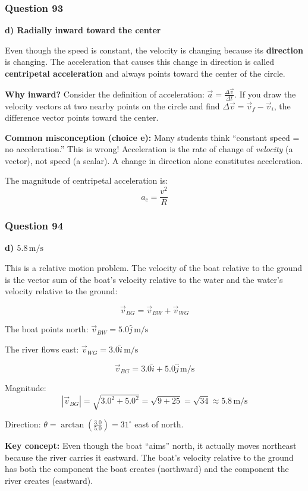 \documentclass[12pt,letterpaper]{article}
\begin{document}
\subsubsection*{Question 93}

\begin{answerbox}
\textbf{d) Radially inward toward the center}
\end{answerbox}

\begin{explanationbox}
Even though the speed is constant, the velocity is changing because its \textbf{direction} is changing. The acceleration that causes this change in direction is called \textbf{centripetal acceleration} and always points toward the center of the circle.

\textbf{Why inward?} Consider the definition of acceleration: $\vec{a} = \frac{\Delta\vec{v}}{\Delta t}$. If you draw the velocity vectors at two nearby points on the circle and find $\Delta\vec{v} = \vec{v}_f - \vec{v}_i$, the difference vector points toward the center.

\textbf{Common misconception (choice e):} Many students think ``constant speed = no acceleration.'' This is wrong! Acceleration is the rate of change of \emph{velocity} (a vector), not speed (a scalar). A change in direction alone constitutes acceleration.

The magnitude of centripetal acceleration is:
\[
a_c = \frac{v^2}{R}
\]
\end{explanationbox}

\subsubsection*{Question 94}

\begin{answerbox}
\textbf{d) $5.8\,\text{m/s}$}
\end{answerbox}

\begin{explanationbox}
This is a relative motion problem. The velocity of the boat relative to the ground is the vector sum of the boat's velocity relative to the water and the water's velocity relative to the ground:

\[
\vec{v}_{BG} = \vec{v}_{BW} + \vec{v}_{WG}
\]

The boat points north: $\vec{v}_{BW} = 5.0\hat{j}\,\text{m/s}$

The river flows east: $\vec{v}_{WG} = 3.0\hat{i}\,\text{m/s}$

\[
\vec{v}_{BG} = 3.0\hat{i} + 5.0\hat{j}\,\text{m/s}
\]

Magnitude:
\[
|\vec{v}_{BG}| = \sqrt{3.0^2 + 5.0^2} = \sqrt{9 + 25} = \sqrt{34} \approx 5.8\,\text{m/s}
\]

Direction: $\theta = \arctan\left(\frac{3.0}{5.0}\right) = 31^\circ$ east of north.

\textbf{Key concept:} Even though the boat ``aims'' north, it actually moves northeast because the river carries it eastward. The boat's velocity relative to the ground has both the component the boat creates (northward) and the component the river creates (eastward).
\end{explanationbox}
\end{document}
